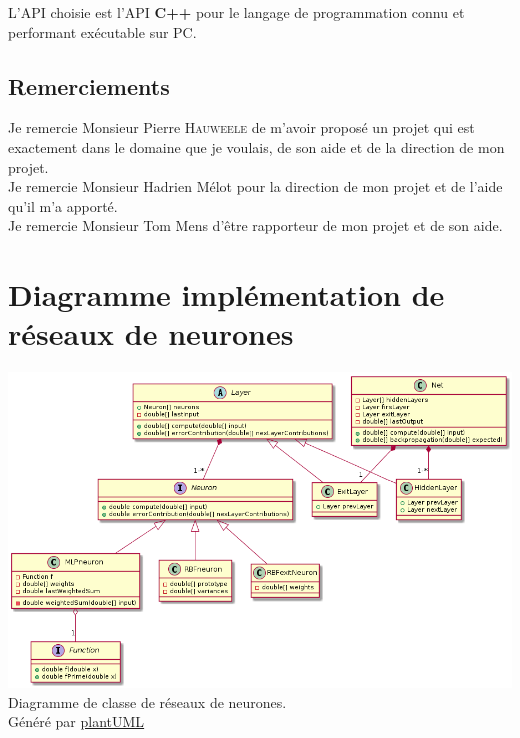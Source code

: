 \documentclass[12pt,a4paper,oneside, titlepage]{article}
\begin{document}
L'API choisie est l'API \textbf{C++} pour le langage de programmation connu et performant exécutable sur PC.


\subsection*{Remerciements}
\noindent Je remercie Monsieur Pierre \textsc{Hauweele} de m'avoir proposé un projet qui est exactement dans le domaine que je voulais, de son aide et de la direction de mon projet.\\

\noindent Je remercie Monsieur Hadrien Mélot pour la direction de mon projet et de l'aide qu'il m'a apporté.\\

\noindent Je remercie Monsieur Tom Mens d'être rapporteur de mon projet et de son aide.\\


\appendix




\section{Diagramme implémentation de réseaux de neurones}\label{uml}
\includegraphics[width=\textwidth]{../../uml/neurondiag.png}
Diagramme de classe de réseaux de neurones.\\Généré par \href{http://plantuml.com/class-diagram}{plantUML}
\end{document}
